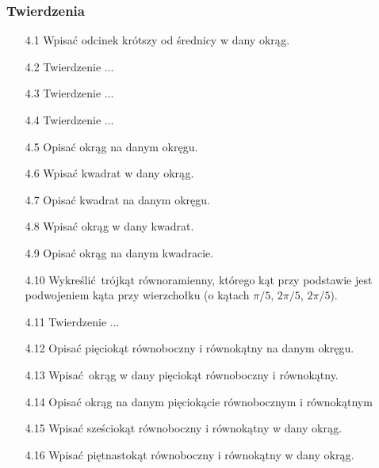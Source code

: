 \subsubsection{Twierdzenia}
\begin{enumerate}
	\item [4.1] Wpisać odcinek krótszy od średnicy w dany okrąg.
	\item [4.2] Twierdzenie ...
	\item [4.3] Twierdzenie ...
	\item [4.4] Twierdzenie ...
	\item [4.5] Opisać okrąg na danym okręgu.
	\item [4.6] Wpisać kwadrat w dany okrąg.
	\item [4.7] Opisać kwadrat na danym okręgu.
	\item [4.8] Wpisać okrąg w dany kwadrat.
	\item [4.9] Opisać okrąg na danym kwadracie.
	\item [4.10] Wykreślić trójkąt równoramienny, którego kąt przy podstawie jest podwojeniem kąta przy wierzchołku (o kątach $\pi/5$, $2\pi/5$, $2\pi/5$).
	\item [4.11] Twierdzenie ...
	\item [4.12] Opisać pięciokąt równoboczny i równokątny na danym okręgu.
	\item [4.13] Wpisać okrąg w dany pięciokąt równoboczny i równokątny.
	\item [4.14] Opisać okrąg na danym pięciokącie równobocznym i równokątnym
	\item [4.15] Wpisać sześciokąt równoboczny i równokątny w dany okrąg.
	\item [4.16] Wpisać piętnastokąt równoboczny i równokątny w dany okrąg.
\end{enumerate}

%